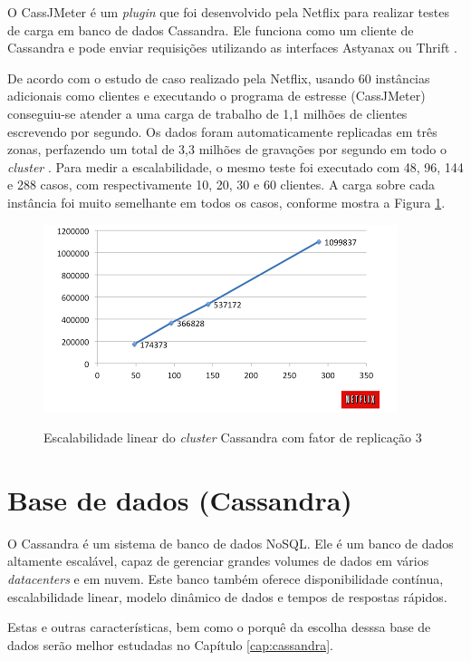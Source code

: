 O CassJMeter é um \textit{plugin} que foi desenvolvido pela Netflix para realizar testes de carga em banco de dados Cassandra. Ele funciona como um cliente de Cassandra e pode enviar requisições utilizando as interfaces Astyanax ou Thrift \cite{DenisSheahan2012}.

De acordo com o estudo de caso realizado pela Netflix, usando 60 instâncias adicionais como clientes e executando o programa de estresse (CassJMeter) conseguiu-se atender a uma carga de trabalho de 1,1 milhões de clientes escrevendo por segundo. Os dados foram automaticamente replicadas em três zonas, perfazendo um total de 3,3 milhões de gravações por segundo em todo o \textit{cluster} \cite{Crockcroft2011}. 
Para medir a escalabilidade, o mesmo teste foi executado com 48, 96, 144 e 288 casos, com respectivamente 10, 20, 30 e 60 clientes. A carga sobre cada instância foi muito semelhante em todos os casos, conforme mostra a Figura \ref{fig:benchNetflix}.

    \begin{figure}[htb]
    \centering
    \includegraphics[scale=0.7]{imagens/scale.png}
    \caption{Escalabilidade linear do \textit{cluster} Cassandra com fator de replicação 3} \cite{Crockcroft2011}
    \label{fig:benchNetflix}
    \end{figure} 

\section{Base de dados (Cassandra)}

O Cassandra é um sistema de banco de dados NoSQL. Ele é um banco de dados altamente escalável, capaz de gerenciar grandes volumes de dados em vários \textit{datacenters} e em nuvem. Este banco também oferece disponibilidade contínua, escalabilidade linear, modelo dinâmico de dados e tempos de respostas rápidos.

Estas e outras características, bem como o porquê da escolha desssa base de dados serão melhor estudadas no Capítulo \ref{cap:cassandra}. 